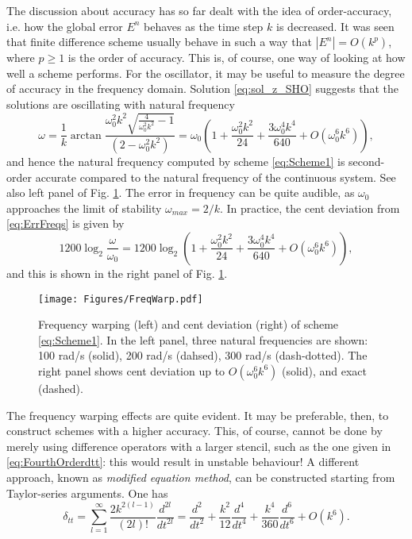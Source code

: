 \documentclass[11pt,twoside,a4paper,english]{book}
\newcommand{\dtt}{\delta_{tt}}
\begin{document}
The discussion about accuracy has so far dealt with the idea of order-accuracy, i.e. how the global error $E^n$ behaves as the time step $k$ is decreased. It was seen that finite difference scheme usually behave in such a way that $|E^n| = O(k^p)$, where $p \geq  1$ is the order of accuracy. This is, of course, one way of looking at how well a scheme performs. For the oscillator, it may be useful to measure the degree of accuracy in the frequency domain. Solution \eqref{eq:sol_z_SHO} suggests that the solutions are oscillating with natural frequency
\begin{equation}\label{eq:ErrFreqs}
    \omega = \frac{1}{k}\arctan{\frac{\omega_0^2k^2\sqrt{\frac{4}{\omega_0^2 k^2}-1}}{(2-\omega_0^2 k^2)}} = \omega_0 \left(1 + \frac{\omega_0^2 k^2}{24} +  \frac{3 \omega_0^4 k^4}{640} + O(\omega_0^6k^6) \right),
\end{equation} 
and hence the natural frequency computed by  scheme \eqref{eq:Scheme1} is second-order accurate compared to the natural frequency of the continuous system. See also left panel of Fig. \ref{eq:FreqWarping}. The error in frequency can be quite audible, as $\omega_0$ approaches the limit of stability $\omega_{max}=2/k$. In practice, the cent deviation from \eqref{eq:ErrFreqs} is given by
\begin{equation}
    1200 \log_{2}\frac{\omega}{\omega_0} = 1200\log_2\left(1 + \frac{\omega_0^2 k^2}{24} +  \frac{3 \omega_0^4 k^4}{640} + O(\omega_0^6k^6) \right), 
\end{equation}
and this is shown in the right panel of Fig. \ref{eq:FreqWarping}.
\begin{figure}
    \texttt{[image: Figures/FreqWarp.pdf]}
    \caption{Frequency warping (left) and cent deviation (right) of scheme \eqref{eq:Scheme1}. In the left panel, three natural frequencies are shown: 100 rad/s (solid), 200 rad/s (dahsed), 300 rad/s (dash-dotted). The right panel shows cent deviation up to $O(\omega_0^6k^6)$ (solid), and exact (dashed).}\label{eq:FreqWarping}
\end{figure}
The frequency warping effects are quite evident. It may be preferable, then, to construct schemes with a higher accuracy. This, of course, cannot be done by merely using difference operators with a larger stencil, such as the one given in \eqref{eq:FourthOrderdtt}: this would result in unstable behaviour! A different approach, known as \emph{modified equation method}, can be constructed starting from Taylor-series arguments. One has
\begin{equation}\label{eq:dttExpasion}
    \dtt = \sum_{l=1}^{\infty}\frac{2k^{2(l-1)}}{(2l)!}\frac{d^{2l}}{dt^{2l}}= \frac{d^2}{dt^2} + \frac{k^2}{12}\frac{d^4}{dt^4} + \frac{k^4}{360}\frac{d^6}{dt^6} + O(k^6).
\end{equation}
\end{document}
